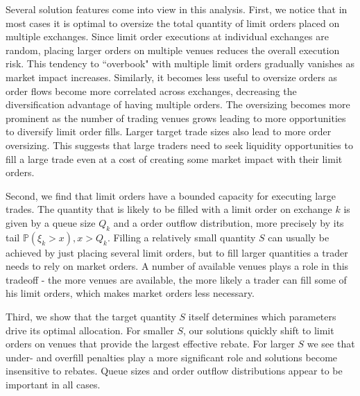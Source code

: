\documentclass[opre,nonblindrev]{informs3}
\begin{document}
Several solution features come into view in this analysis. First, we notice that in most cases it is optimal to oversize the total quantity of limit orders placed on multiple exchanges. Since limit order executions at individual exchanges are random, placing larger orders on multiple venues reduces the overall execution risk. This tendency to ``overbook" with multiple limit orders gradually vanishes as market impact increases. Similarly, it becomes less useful to oversize orders as order flows become more correlated across exchanges, decreasing the diversification advantage of having multiple orders. The oversizing becomes more prominent as the number of trading venues grows leading to more opportunities to diversify limit order fills. Larger target trade sizes also lead to more order oversizing. This suggests that large traders need to seek liquidity opportunities to fill a large trade even at a cost of creating some market impact with their limit orders.

Second, we find that limit orders have a bounded capacity for executing large trades. The quantity that is likely to be filled with a limit order on exchange $k$ is given by a queue size $Q_k$ and a order outflow distribution, more precisely by its tail $\mathbb{P}(\xi_k>x), x>Q_k$. Filling a relatively small quantity $S$ can usually be achieved by just placing several limit orders, but to fill larger quantities a trader needs to rely on market orders. A number of available venues plays a role in this tradeoff - the more venues are available, the more likely a trader can fill some of his limit orders, which makes market orders less necessary.

Third, we show that the target quantity $S$ itself determines which parameters drive its optimal allocation. For smaller $S$, our solutions quickly shift to limit orders on venues that provide the largest effective rebate. For larger $S$ we see that under- and overfill penalties play a more significant role and solutions become insensitive to rebates. Queue sizes and order outflow distributions appear to be important in all cases.
\end{document}
